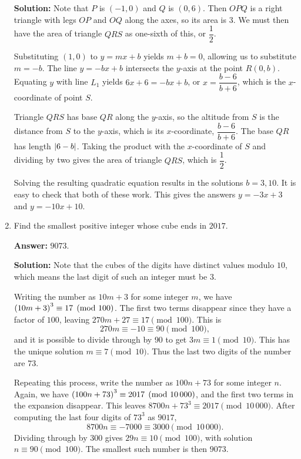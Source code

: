 \documentclass[11pt,paper=letter]{scrartcl}
\begin{document}
\begin{enumerate}[left=0pt]
\textbf{Solution:} Note that $P$ is $(-1, 0)$ and $Q$ is $(0, 6)$. Then $OPQ$ is a right triangle with legs $OP$ and $OQ$ along the axes, so its area is $3$. We must then have the area of triangle $QRS$ as one-sixth of this, or $\dfrac12$.

Substituting $(1, 0)$ to $y = mx + b$ yields $m + b = 0$, allowing us to substitute $m = -b$. The line $y = -bx + b$ intersects the $y$-axis at the point $R(0, b)$. Equating $y$ with line $L_1$ yields $6x + 6 = -bx + b$, or $x = \dfrac{b-6}{b+6}$, which is the $x$-coordinate of point $S$.

Triangle $QRS$ has base $QR$ along the $y$-axis, so the altitude from $S$ is the distance from $S$ to the $y$-axis, which is its $x$-coordinate, $\dfrac{b-6}{b+6}$. The base $QR$ has length $\left\lvert 6-b \right\rvert$. Taking the product with the $x$-coordinate of $S$ and dividing by two gives the area of triangle $QRS$, which is $\dfrac12$.

Solving the resulting quadratic equation results in the solutions $b = 3, 10$. It is easy to check that both of these work. This gives the answers $y = -3x + 3$ and $y = -10x + 10$.

\item Find the smallest positive integer whose cube ends in $2017$.

\textbf{Answer:} $\boxed{9073}$.

\textbf{Solution:} Note that the cubes of the digits have distinct values modulo $10$, which means the last digit of such an integer must be $3$.

Writing the number as $10m + 3$ for some integer $m$, we have $\left( 10m + 3 \right)^3 \equiv 17 \pmod{100}$. The first two terms disappear since they have a factor of $100$, leaving $270m + 27 \equiv 17 \pmod{100}$. This is $$270m \equiv -10 \equiv 90 \pmod{100},$$ and it is possible to divide through by $90$ to get $3m \equiv 1 \pmod{10}$. This has the unique solution $m \equiv 7 \pmod{10}$. Thus the last two digits of the number are $73$.

Repeating this process, write the number as $100n + 73$ for some integer $n$. Again, we have $\left( 100n + 73 \right)^3 \equiv 2017 \pmod{10\,000}$, and the first two terms in the expansion disappear. This leaves $8700n + 73^3 \equiv 2017 \pmod{10\,000}$. After computing the last four digits of $73^3$ as $9017$, $$8700n \equiv -7000 \equiv 3000 \pmod{10\,000}.$$ Dividing through by $300$ gives $29n \equiv 10 \pmod{100}$, with solution $n \equiv 90 \pmod{100}$. The smallest such number is then $9073$. 


\end{enumerate}
\end{document}
